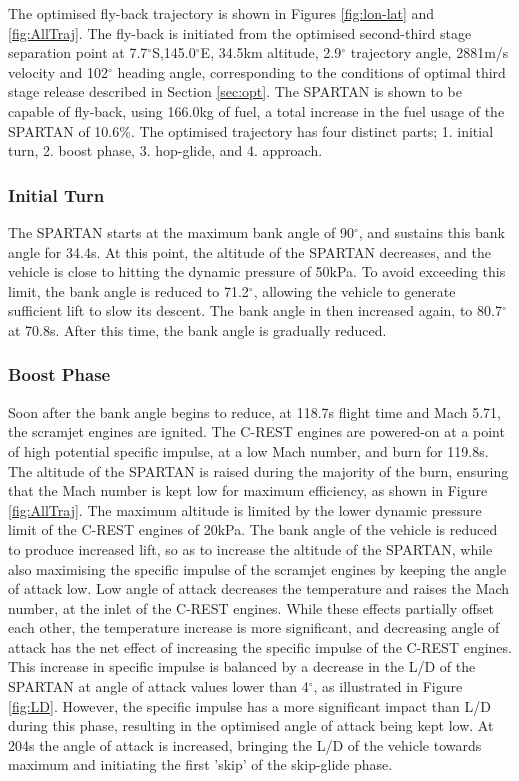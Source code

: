 \documentclass[journal]{new-aiaa} %
\begin{document}
The optimised fly-back trajectory is shown in Figures \ref{fig:lon-lat} and \ref{fig:AllTraj}.
The fly-back is initiated from the optimised second-third stage separation point at 7.7$^\circ$S,145.0$^\circ$E, 34.5km altitude, 2.9$^\circ$ trajectory angle, 2881m/s velocity and 102$^\circ$ heading angle, corresponding to the conditions of optimal third stage release described in Section \ref*{sec:opt}. 
The SPARTAN is shown to be capable of fly-back, using 166.0kg of fuel, a total increase in the fuel usage of the SPARTAN of 10.6\%.
The optimised trajectory has four distinct parts; 1. initial turn, 2. boost phase, 3. hop-glide, and 4. approach. 

\subsubsection{ Initial Turn}
The SPARTAN starts at the maximum bank angle of 90$^\circ$, and sustains this bank angle for 34.4s. At this point, the altitude of the SPARTAN decreases, and the vehicle is close to hitting the dynamic pressure of 50kPa. To avoid exceeding this limit, the bank angle is reduced to 71.2$^\circ$, allowing the vehicle to generate sufficient lift to slow its descent. The bank angle in then increased again, to 80.7$^\circ$ at 70.8s. After this time, the bank angle is gradually reduced. 

\subsubsection{ Boost Phase}
Soon after the bank angle begins to reduce, at 118.7s flight time and Mach 5.71, the scramjet engines are ignited. The C-REST engines are powered-on at a point of high potential specific impulse, at a low Mach number, and burn for 119.8s. The altitude of the SPARTAN is raised during the majority of the burn, ensuring that the Mach number is kept low for maximum efficiency\cite{Preller2017}, as shown in Figure \ref{fig:AllTraj}. The maximum altitude is limited by the lower dynamic pressure limit of the C-REST engines of 20kPa. The bank angle of the vehicle is reduced to produce increased lift, so as to increase the altitude of the SPARTAN, while also maximising the specific impulse of the scramjet engines by keeping the angle of attack low. Low angle of attack decreases the temperature and raises the Mach number, at the inlet of the C-REST engines. While these effects partially offset each other\cite{Preller2017}, the temperature increase is more significant, and decreasing angle of attack has the net effect of increasing the specific impulse of the C-REST engines. This increase in specific impulse is balanced by a decrease in the L/D of the SPARTAN at angle of attack values lower than 4$^\circ$, as illustrated in Figure \ref{fig:LD}. However, the specific impulse has a more significant impact than L/D during this phase, resulting in the optimised angle of attack being kept low. At 204s the angle of attack is increased, bringing the L/D of the vehicle towards maximum and initiating the first 'skip' of the skip-glide phase.  
\end{document}
